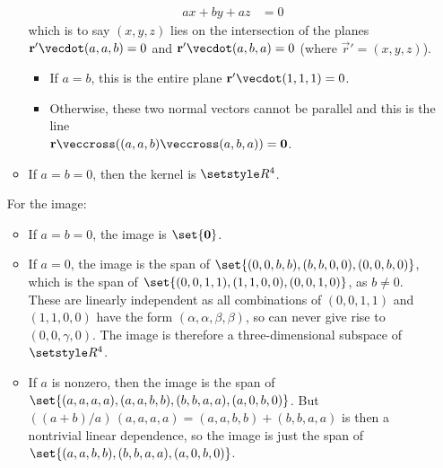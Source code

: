 \documentclass[fleqn,a4paper,11pt]{article}
\begin{document}
\begin{enumerate}[label=\textbf{\arabic*.}]
\begin{itemize}
\begin{align*}
       ax + by + az &= 0
      \end{align*}
      which is to say \((x, y, z)\) lies on the intersection of the planes
      \(\vec r' \vecdot (a, a, b) = 0\) and
      \(\vec r' \vecdot (a, b, a) = 0\) (where \(\vec r' = (x, y, z)\)).
      \begin{itemize}
       \item
        If \(a = b\), this is the entire plane
        \(\vec r' \vecdot (1, 1, 1) = 0\).
       \item
        Otherwise, these two normal vectors cannot be parallel and this is the
        line \\
        \(\vec r \veccross ((a, a, b) \veccross (a, b, a)) = \vec 0\).
      \end{itemize}
     \item If \(a = b = 0\), then the kernel is \(\Reals^4\).
    \end{itemize}
    For the image:
    \begin{itemize}
     \item
      If \(a = b = 0\), the image is \(\set{\vec 0}\).
     \item If \(a = 0\), the image is the span of
      \(\set{(0, 0, b, b), (b, b, 0, 0), (0, 0, b, 0)}\), which is the span of
      \(\set{(0, 0, 1, 1), (1, 1, 0, 0), (0, 0, 1, 0)}\), as \(b \ne 0\). These
      are linearly independent as all combinations of
      \((0, 0, 1, 1)\) and \((1, 1, 0, 0)\) have the form
      \((\alpha, \alpha, \beta, \beta)\), so can never give rise to
      \((0, 0, \gamma, 0)\). The image is therefore a three-dimensional subspace
      of \(\Reals^4\).
     \item If \(a\) is nonzero, then the image is the span of
      \(\set{(a, a, a, a), (a, a, b, b), (b, b, a, a), (a, 0, b, 0)}\).
      But \(((a + b)/a)\,(a, a, a, a) = (a, a, b, b) + (b, b, a, a)\) is then a
      nontrivial linear dependence, so the image is just the span of
      \(\set{(a, a, b, b), (b, b, a, a), (a, 0, b, 0)}\).


\end{itemize}
\end{enumerate}
\end{document}
